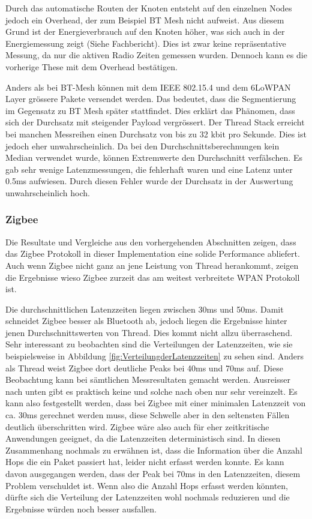 Durch das automatische Routen der Knoten entsteht auf den einzelnen Nodes jedoch ein Overhead, der zum Beispiel BT Mesh nicht aufweist.
Aus diesem Grund ist der Energieverbrauch auf den Knoten höher, was sich auch in der Energiemessung zeigt (Siehe Fachbericht). Dies ist zwar keine repräsentative Messung, da nur die aktiven Radio Zeiten gemessen wurden. Dennoch kann es die vorherige These mit dem Overhead bestätigen. 

Anders als bei BT-Mesh können mit dem IEEE 802.15.4 und dem 6LoWPAN Layer grössere Pakete versendet werden. Das bedeutet, dass die Segmentierung im Gegensatz zu BT Mesh später stattfindet. Dies erklärt das Phänomen, dass sich der Durchsatz mit steigender Payload vergrössert. Der Thread Stack erreicht bei manchen Messreihen einen Durchsatz von bis zu 32 kbit pro Sekunde. Dies ist jedoch eher unwahrscheinlich. Da bei den Durchschnittsberechnungen kein Median verwendet wurde, können Extremwerte den Durchschnitt verfälschen. Es gab sehr wenige Latenzmessungen, die fehlerhaft waren und eine Latenz unter 0.5ms aufwiesen. Durch diesen Fehler wurde der Durchsatz in der Auswertung unwahrscheinlich hoch. 

\subsubsection{Zigbee}\label{subsubsec:FazitZigbee}
Die Resultate und Vergleiche aus den vorhergehenden Abschnitten zeigen, dass das Zigbee Protokoll in dieser Implementation eine solide Performance abliefert.
Auch wenn Zigbee nicht ganz an jene Leistung von Thread herankommt, zeigen die Ergebnisse wieso Zigbee zurzeit das am weitest verbreitete WPAN Protokoll ist.

Die durchschnittlichen Latenzzeiten liegen zwischen 30ms und 50ms. Damit schneidet Zigbee besser als Bluetooth ab, jedoch liegen die Ergebnisse hinter jenen Durchschnittswerten von Thread.
Dies kommt nicht allzu überraschend.
Sehr interessant zu beobachten sind die Verteilungen der Latenzzeiten, wie sie beispielsweise in Abbildung \ref{fig:VerteilungderLatenzzeiten} zu sehen sind.
Anders als Thread weist Zigbee dort deutliche Peaks bei 40ms und 70ms auf.
Diese Beobachtung kann bei sämtlichen Messresultaten gemacht werden.
Ausreisser nach unten gibt es praktisch keine und solche nach oben nur sehr vereinzelt.
Es kann also festgestellt werden, dass bei Zigbee mit einer minimalen Latenzzeit von ca. 30ms gerechnet werden muss, diese Schwelle aber in den seltensten Fällen deutlich überschritten wird.
Zigbee wäre also auch für eher zeitkritische Anwendungen geeignet, da die Latenzzeiten deterministisch sind.
In diesen Zusammenhang nochmals zu erwähnen ist, dass die Information über die Anzahl Hops die ein Paket passiert hat, leider nicht erfasst werden konnte.
Es kann davon ausgegangen werden, dass der Peak bei 70ms in den Latenzzeiten, diesem Problem verschuldet ist.
Wenn also die Anzahl Hops erfasst werden könnten, dürfte sich die Verteilung der Latenzzeiten wohl nochmals reduzieren und die Ergebnisse würden noch besser ausfallen.

